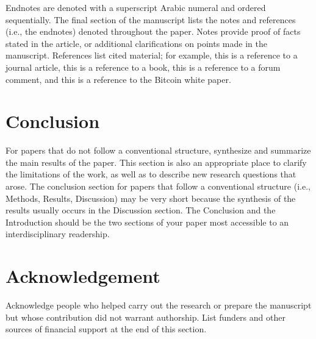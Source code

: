 \documentclass{ledger}
\begin{document}
Endnotes are denoted with a superscript Arabic numeral and ordered sequentially.  The final section of the manuscript lists the notes and references (i.e., the endnotes) denoted throughout the paper.  Notes provide proof of facts stated in the article, or additional clarifications on points made in the manuscript.  References list cited material; for example, this is a reference to a journal article, this is a reference to a book, this is a reference to a forum comment, and this is a reference to the Bitcoin white paper.

\section{Conclusion}

For papers that do not follow a conventional structure, synthesize and summarize the main results of the paper.  This section is also an appropriate place to clarify the limitations of the work, as well as to describe new research questions that arose.  The conclusion section for papers that follow a conventional structure (i.e., Methods, Results, Discussion) may be very short because the synthesis of the results usually occurs in the Discussion section.  The Conclusion and the Introduction should be the two sections of your paper most accessible to an interdisciplinary readership.

\ledgernotes

\section{Acknowledgement}

Acknowledge people who helped carry out the research or prepare the manuscript but whose contribution did not warrant authorship.  List funders and other sources of financial support at the end of this section.  
\end{document}
